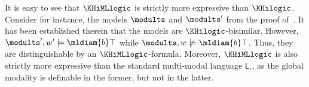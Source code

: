 It is easy to see that $\KHiMLlogic$ is strictly more expressive than $\KHilogic$.
Consider for instance, the models $\modults$ and $\modults'$ from the proof of~. It has been established therein that the models are $\KHilogic$-bisimilar. However, $\modults',w'\models\mldiam{b}\top$ while  $\modults,w\not\models\mldiam{b}\top$. Thus, they are distinguishable by an $\KHiMLlogic$-formula. 
Moreover, $\KHiMLlogic$ is also strictly more expressive than the standard multi-modal language $\mathsf{L}_{\square}$, as the global modality is definable in the former, but not in the latter.

\medskip

